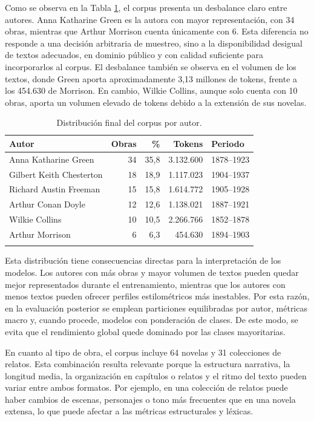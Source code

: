 \documentclass[IB]{TFUOC}%
\begin{document}
Como se observa en la Tabla \ref{tab:resultados-corpus-autores}, el corpus presenta un desbalance claro entre autores. Anna Katharine Green es la autora con mayor representación, con 34 obras, mientras que Arthur Morrison cuenta únicamente con 6. Esta diferencia no responde a una decisión arbitraria de muestreo, sino a la disponibilidad desigual de textos adecuados, en dominio público y con calidad suficiente para incorporarlos al corpus. El desbalance también se observa en el volumen de los textos, donde Green aporta aproximadamente 3,13 millones de tokens, frente a los 454.630 de Morrison. En cambio, Wilkie Collins, aunque solo cuenta con 10 obras, aporta un volumen elevado de tokens debido a la extensión de sus novelas.

\begin{longtable}{|p{4.5cm}|r|r|r|p{2.5cm}|}
\hline
\textbf{Autor} & \textbf{Obras} & \textbf{\%} & \textbf{Tokens} & \textbf{Periodo} \\
\hline
Anna Katharine Green & 34 & 35,8 & 3.132.600 & 1878--1923 \\
\hline
Gilbert Keith Chesterton & 18 & 18,9 & 1.117.023 & 1904--1937 \\
\hline
Richard Austin Freeman & 15 & 15,8 & 1.614.772 & 1905--1928 \\
\hline
Arthur Conan Doyle & 12 & 12,6 & 1.138.021 & 1887--1921 \\
\hline
Wilkie Collins & 10 & 10,5 & 2.266.766 & 1852--1878 \\
\hline
Arthur Morrison & 6 & 6,3 & 454.630 & 1894--1903 \\
\hline
\caption{Distribución final del corpus por autor.}
\label{tab:resultados-corpus-autores}
\end{longtable}

Esta distribución tiene consecuencias directas para la interpretación de los modelos. Los autores con más obras y mayor volumen de textos pueden quedar mejor representados durante el entrenamiento, mientras que los autores con menos textos pueden ofrecer perfiles estilométricos más inestables. Por esta razón, en la evaluación posterior se emplean particiones equilibradas por autor, métricas macro y, cuando procede, modelos con ponderación de clases. De este modo, se evita que el rendimiento global quede dominado por las clases mayoritarias.

En cuanto al tipo de obra, el corpus incluye 64 novelas y 31 colecciones de relatos. Esta combinación resulta relevante porque la estructura narrativa, la longitud media, la organización en capítulos o relatos y el ritmo del texto pueden variar entre ambos formatos. Por ejemplo, en una colección de relatos puede haber cambios de escenas, personajes o tono más frecuentes que en una novela extensa, lo que puede afectar a las métricas estructurales y léxicas.
\end{document}
